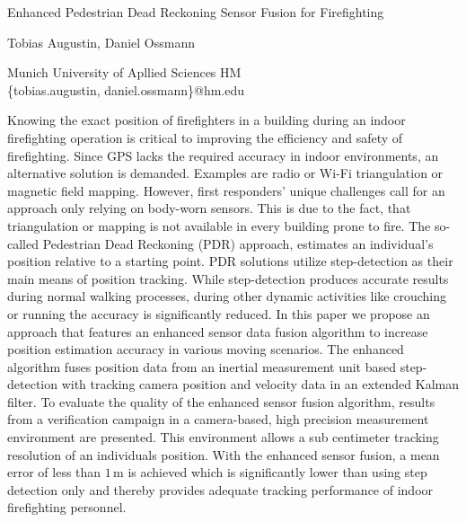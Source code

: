 \documentclass[10pt,a4paper]{article}
\begin{document}
	
	\Large
	\begin{center}
		Enhanced Pedestrian Dead Reckoning Sensor Fusion for Firefighting\\ 
		
		\hspace{10pt}
		
		\large
		Tobias Augustin, Daniel Ossmann \\
		
		\hspace{10pt}
		
		\small  
		Munich University of Apllied Sciences HM\\
		\{tobias.augustin, daniel.ossmann\}@hm.edu\\
		
		
	\end{center}
	
	\hspace{10pt}
	
	\normalsize
	
	Knowing the exact position of firefighters in a building during an indoor firefighting operation is critical to improving the efficiency and safety of firefighting. Since GPS lacks the required accuracy in indoor environments, an alternative solution is demanded. Examples are radio or Wi-Fi triangulation or magnetic field mapping. However, first responders' unique challenges call for an approach only relying on body-worn sensors. This is due to the fact, that triangulation or mapping is not available in every building prone to fire. The so-called Pedestrian Dead Reckoning (PDR) approach, estimates an individual's position relative to a starting point. PDR solutions utilize step-detection as their main means of position tracking. While step-detection produces accurate results during normal walking processes, during other dynamic activities like crouching or running the accuracy is significantly reduced. In this paper we propose an approach that features an enhanced sensor data fusion algorithm to increase position estimation accuracy in various moving scenarios. The enhanced algorithm fuses position data from an inertial measurement unit based step-detection with tracking camera position and velocity data in an extended Kalman filter. To evaluate the quality of the enhanced sensor fusion algorithm, results from a verification campaign in a camera-based, high precision measurement environment are presented. This environment allows a sub centimeter tracking resolution of an individuals position. With the enhanced sensor fusion, a mean error of less than $1\,\mathrm{m}$ is achieved which is significantly lower than using step detection only and thereby provides adequate tracking performance of indoor firefighting personnel.
	\vspace{1cm}
	
\end{document}
